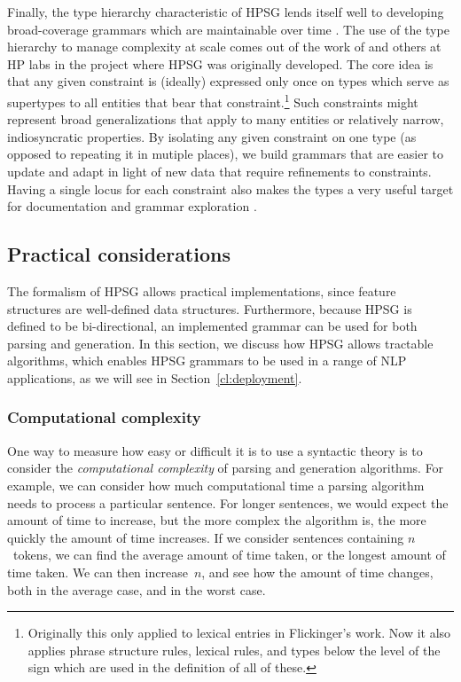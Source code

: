 \documentclass[output=paper]{langsci/langscibook}
\begin{document}
Finally, the type hierarchy characteristic of HPSG lends itself well to developing broad-coverage grammars which are maintainable over time \citep{FIXME-find-cite?}. The use of the type hierarchy to manage complexity at scale comes out of the work of \citet{Flickinger87} and others at HP labs in the project where HPSG was originally developed. The core idea is that any given constraint is (ideally) expressed only once on types which serve as supertypes to all entities that bear that constraint.\footnote{Originally this only applied to lexical entries in Flickinger's work. Now it also applies phrase structure rules, lexical rules, and types below the level of the sign which are used in the definition of all of these.} Such constraints might represent broad generalizations that apply to many entities or relatively narrow, indiosyncratic properties. By isolating any given constraint on one type (as opposed to repeating it in mutiple places), we build grammars that are easier to update and adapt in light of new data that require refinements to constraints. Having a single locus for each constraint also makes the types a very useful target for documentation \citep{FIXME:LTDB} and grammar exploration \citep{FIXME:typediff}. 


\subsection{Practical considerations}
\label{cl:prac}

The formalism of HPSG allows practical implementations,
since feature structures are well-defined data structures.
Furthermore, because HPSG is defined to be bi-directional,
an implemented grammar can be used for both parsing and generation.
In this section, we discuss how HPSG allows tractable algorithms,
which enables HPSG grammars to be used in a range of NLP applications,
as we will see in Section~\ref{cl:deployment}.

\subsubsection{Computational complexity}
\label{cl:prac:comp}

One way to measure how easy or difficult it is to use a syntactic theory
is to consider the \textit{computational complexity} of parsing and generation algorithms.
For example, we can consider how much computational time
a parsing algorithm needs to process a particular sentence.
For longer sentences, we would expect the amount of time to increase,
but the more complex the algorithm is,
the more quickly the amount of time increases.
If we consider sentences containing $n$~tokens,
we can find the average amount of time taken,
or the longest amount of time taken.
We can then increase~$n$, and see how the amount of time changes,
both in the average case, and in the worst case.
\end{document}

